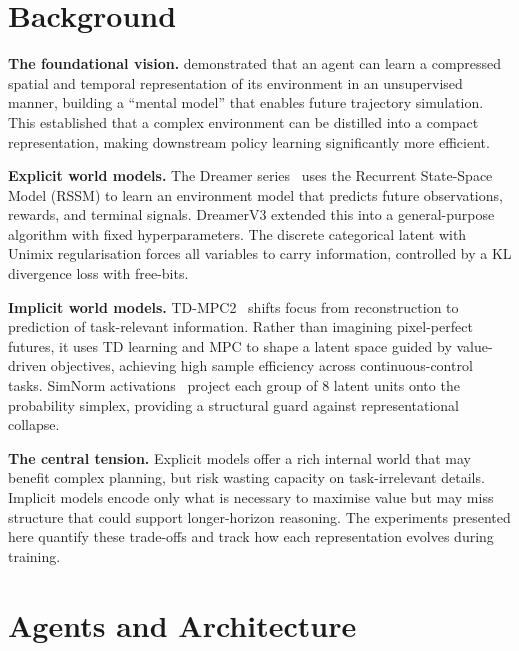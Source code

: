 \documentclass{article}
\begin{document}
\section{Background}
\label{sec:background}

\textbf{The foundational vision.}
\citet{ha2018worldmodels} demonstrated that an agent can learn a compressed spatial
and temporal representation of its environment in an unsupervised manner, building a
``mental model'' that enables future trajectory simulation.
This established that a complex environment can be distilled into a compact
representation, making downstream policy learning significantly more efficient.

\textbf{Explicit world models.}
The Dreamer series~\citep{hafner2020dreamer,hafner2021dreamerv2,hafner2023dreamerv3}
uses the Recurrent State-Space Model (RSSM) to learn an environment model that predicts
future observations, rewards, and terminal signals.
DreamerV3 extended this into a general-purpose algorithm with fixed hyperparameters.
The discrete categorical latent with Unimix regularisation forces all variables to
carry information, controlled by a KL divergence loss with free-bits.

\textbf{Implicit world models.}
TD-MPC2~\citep{hansen2024tdmpc2} shifts focus from reconstruction to prediction of
task-relevant information.
Rather than imagining pixel-perfect futures, it uses TD learning and MPC to shape a
latent space guided by value-driven objectives, achieving high sample efficiency across
continuous-control tasks.
SimNorm activations~\citep{hansen2024tdmpc2} project each group of 8 latent units onto
the probability simplex, providing a structural guard against representational collapse.

\textbf{The central tension.}
Explicit models offer a rich internal world that may benefit complex planning, but risk
wasting capacity on task-irrelevant details.
Implicit models encode only what is necessary to maximise value but may miss structure
that could support longer-horizon reasoning.
The experiments presented here quantify these trade-offs and track how each
representation evolves during training.

\section{Agents and Architecture}
\label{sec:agents}
\end{document}
